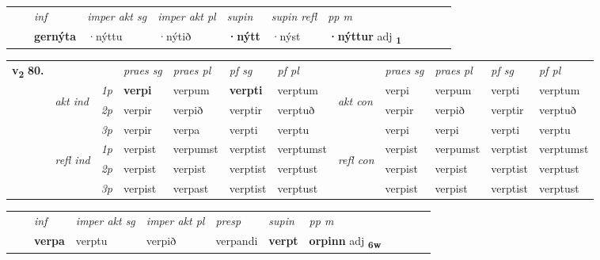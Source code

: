 \begin{tabular}{llllllllllll}
 & & \textit{inf} & \textit{imper akt sg} & \textit{imper akt pl}    & \textit{supin} & \textit{supin refl} & \textit{pp m}     \\*
  & & \textbf{gernýta} & ·nýttu  & ·nýtið    &  \textbf{·nýtt} & ·nýst & \textbf{·nýttur} adj \textbf{\textsubscript{1}} \\*
\cmidrule{1-12}
\end{tabular}



\begin{tabular}{llllllllllll} \toprule
\multirow{4}{*}{{{\textbf{v{\textsubscript{2}}} \Large{\textbf{80.}}}}}  & &   &  \textit{praes sg}  & \textit{praes pl}  &\textit{ pf sg} & \textit{pf pl} &  &  \textit{praes sg}  & \textit{praes pl}  & \textit{pf sg} & \textit{pf pl } \\*
	\cmidrule{4-7} \cmidrule{9-12}
 & \multirow{3}{*}{\begin{turn}{90}\textit{akt ind}\end{turn}} & {\textit{1p}} & \textbf{verpi} & verpum    & \textbf{verpti} & verptum & \multirow{3}{*}{\begin{turn}{90}\textit{akt con}\end{turn}} &verpi & verpum & verpti & verptum\\*
& &  {\textit{2p}} &  verpir  & verpið   & verptir & verptuð & & verpir & verpið & verptir & verptuð \\*
& &  {\textit{3p}} & verpir & verpa   & verpti & verptu & & verpi & verpi& verpti & verptu  \\*
\cmidrule{4-7} \cmidrule{9-12}
 &\multirow{3}{*}{\begin{turn}{90}\textit{refl ind}\end{turn}} & {\textit{1p}} & verpist & verpumst    & verptist & verptumst & \multirow{3}{*}{\begin{turn}{90}\textit{refl con}\end{turn}}  &verpist & verpumst & verptist & verptumst\\*
 &&  {\textit{2p}} &  verpist  & verpist   & verptist & verptust & &verpist & verpist & verptist & verptust \\*
& &  {\textit{3p}} & verpist & verpast   & verptist & verptust & & verpist & verpist& verptist & verptust  \\*
\cmidrule{4-7} \cmidrule{9-12}
\end{tabular}


\begin{tabular}{llllllllllll}
 & & \textit{inf} & \textit{imper akt sg} & \textit{imper akt pl}   & \textit{presp} & \textit{supin}  & \textit{pp m}     \\*
  & & \textbf{verpa} & verptu  & verpið   & verpandi &  \textbf{verpt}  & \textbf{orpinn} adj \textbf{\textsubscript{6w}} \\*
\cmidrule{1-12}
\end{tabular}



